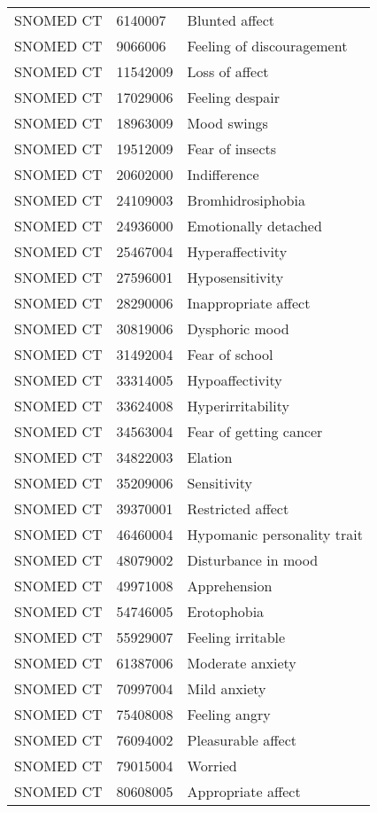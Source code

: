 \begin{longtable}{p{}p{}p{}}
  SNOMED CT & 6140007 & Blunted affect \\ 
  SNOMED CT & 9066006 & Feeling of discouragement \\ 
  SNOMED CT & 11542009 & Loss of affect \\ 
  SNOMED CT & 17029006 & Feeling despair \\ 
  SNOMED CT & 18963009 & Mood swings \\ 
  SNOMED CT & 19512009 & Fear of insects \\ 
  SNOMED CT & 20602000 & Indifference \\ 
  SNOMED CT & 24109003 & Bromhidrosiphobia \\ 
  SNOMED CT & 24936000 & Emotionally detached \\ 
  SNOMED CT & 25467004 & Hyperaffectivity \\ 
  SNOMED CT & 27596001 & Hyposensitivity \\ 
  SNOMED CT & 28290006 & Inappropriate affect \\ 
  SNOMED CT & 30819006 & Dysphoric mood \\ 
  SNOMED CT & 31492004 & Fear of school \\ 
  SNOMED CT & 33314005 & Hypoaffectivity \\ 
  SNOMED CT & 33624008 & Hyperirritability \\ 
  SNOMED CT & 34563004 & Fear of getting cancer \\ 
  SNOMED CT & 34822003 & Elation \\ 
  SNOMED CT & 35209006 & Sensitivity \\ 
  SNOMED CT & 39370001 & Restricted affect \\ 
  SNOMED CT & 46460004 & Hypomanic personality trait \\ 
  SNOMED CT & 48079002 & Disturbance in mood \\ 
  SNOMED CT & 49971008 & Apprehension \\ 
  SNOMED CT & 54746005 & Erotophobia \\ 
  SNOMED CT & 55929007 & Feeling irritable \\ 
  SNOMED CT & 61387006 & Moderate anxiety \\ 
  SNOMED CT & 70997004 & Mild anxiety \\ 
  SNOMED CT & 75408008 & Feeling angry \\ 
  SNOMED CT & 76094002 & Pleasurable affect \\ 
  SNOMED CT & 79015004 & Worried \\ 
  SNOMED CT & 80608005 & Appropriate affect \\ 

\end{longtable}
